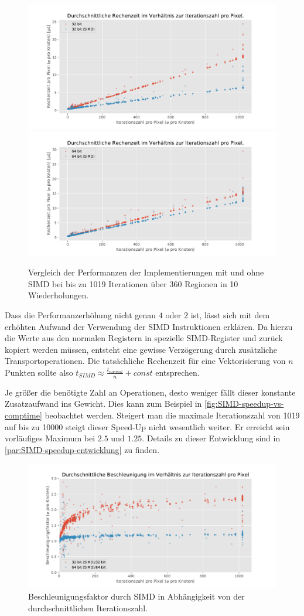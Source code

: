 \begin{figure}
	\centering
	\includegraphics[width=0.45\linewidth]{img/Evaluation/simd/itvscmp32.pdf}
	\includegraphics[width=0.45\linewidth]{img/Evaluation/simd/itvscmp64.pdf}
	\caption{Vergleich der Performanzen der Implementierungen mit und ohne SIMD bei bis zu 1019 Iterationen über 360 Regionen in 10 Wiederholungen.}
	\label{fig:SIMD-speedup}
\end{figure}

Dass die Performanzerhöhung nicht genau $4$ oder $2$ ist, lässt sich mit dem erhöhten Aufwand der Verwendung
der SIMD Instruktionen erklären.
Da hierzu die Werte aus den normalen Registern in spezielle SIMD-Register und zurück
kopiert werden müssen, entsteht eine gewisse Verzögerung durch zusätzliche Transportoperationen.
Die tatsächliche Rechenzeit für eine Vektorisierung von \(n\) Punkten sollte also \(t_{SIMD} \approx \frac{t_{normal}}{n}+ const\) entsprechen.

Je größer die benötigte Zahl an Operationen, desto weniger fällt dieser konstante Zusatzaufwand ins Gewicht.
Dies kann zum Beispiel in \autoref{fig:SIMD-speedup-vs-comptime} beobachtet werden.
Steigert man die maximale Iterationszahl von 1019 auf bis zu 10000 steigt dieser Speed-Up nicht wesentlich weiter.
Er erreicht sein vorläufiges Maximum bei $2.5$ und $1.25$. Details zu dieser Entwicklung sind in \autoref{par:SIMD-speedup-entwicklung} zu finden.

\begin{figure}
	\centering
	\includegraphics[width=0.9\linewidth]{img/Evaluation/simd/speedup.pdf}
	\caption{Beschleunigungsfaktor durch SIMD in Abhängigkeit von der durchschnittlichen Iterationszahl.}
	\label{fig:SIMD-speedup-vs-comptime}
\end{figure}

